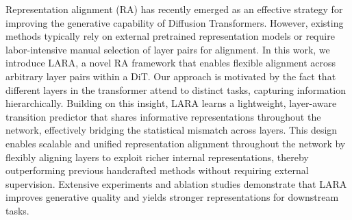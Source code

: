 Representation alignment (RA) has recently emerged as an effective strategy for improving the generative capability of Diffusion Transformers. However, existing methods typically rely on external pretrained representation models or require labor-intensive manual selection of layer pairs for alignment. In this work, we introduce LARA, a novel RA framework that enables flexible alignment across arbitrary layer pairs within a DiT. Our approach is motivated by the fact that different layers in the transformer attend to distinct tasks, capturing information hierarchically. Building on this insight, LARA learns a lightweight, layer-aware transition predictor that shares informative representations throughout the network, effectively bridging the statistical mismatch across layers. This design enables scalable and unified representation alignment throughout the network by flexibly aligning layers to exploit richer internal representations, thereby outperforming previous handcrafted methods without requiring external supervision. Extensive experiments and ablation studies demonstrate that LARA improves generative quality and yields stronger representations for downstream tasks.